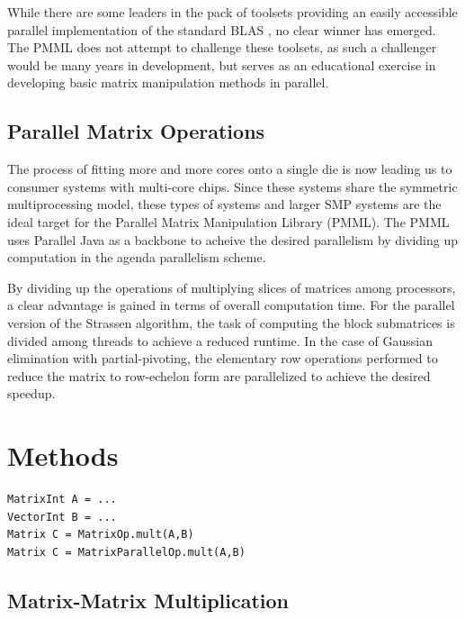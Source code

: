 \documentclass{dependencies/acm_proc_article-sp}
\begin{document}
While there are some leaders in the pack of toolsets providing an easily accessible parallel implementation of the standard BLAS \cite{SCALAPACK,PLAPACK}, no clear winner has emerged. The PMML does not attempt to challenge these toolsets, as such a challenger would be many years in development, but serves as an educational exercise in developing basic matrix manipulation methods in parallel. 

\subsection{Parallel Matrix Operations}

The process of fitting more and more cores onto a single die is now leading us to consumer systems with multi-core chips. Since these systems share the symmetric multiprocessing model, these types of systems and larger SMP systems are the ideal target for the Parallel Matrix Manipulation Library (PMML). The PMML uses Parallel Java as a backbone to acheive the desired parallelism by dividing up computation in the agenda parallelism scheme.

By dividing up the operations of multiplying slices of matrices among processors, a clear advantage is gained in terms of overall computation time. For the parallel version of the Strassen algorithm, the task of computing the block submatrices is divided among threads to achieve a reduced runtime. In the case of Gaussian elimination with partial-pivoting, the elementary row operations performed to reduce the matrix to row-echelon form are parallelized to achieve the desired speedup.

\section{Methods}

\begin{verbatim}
MatrixInt A = ...
VectorInt B = ...
Matrix C = MatrixOp.mult(A,B)
Matrix C = MatrixParallelOp.mult(A,B)

\end{verbatim}



\subsection{Matrix-Matrix Multiplication}
\end{document}

